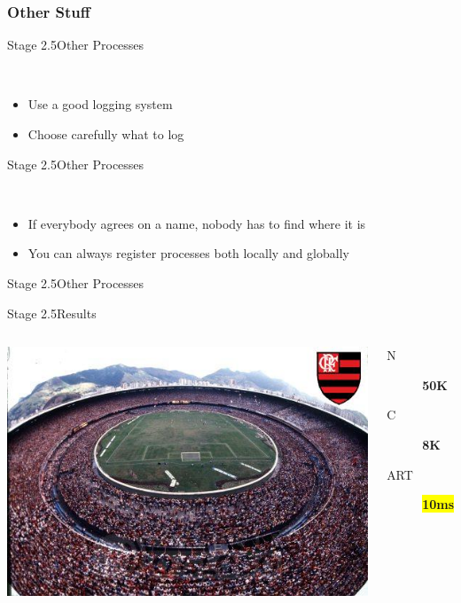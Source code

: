 \documentclass[utf8,hyperref={colorlinks=true}]{beamer}
\begin{document}
\subsubsection{Other Stuff}
\begin{frame}{Stage 2.5}{Other Processes}
	\begin{description}
		\item<+->[Logging]\ \\
			\begin{itemize}
				\item Use a good logging system
				\item Choose carefully what to log
			\end{itemize}
	\end{description}
\end{frame}
\begin{frame}{Stage 2.5}{Other Processes}
	\begin{description}
		\item<+->[Registration]\ \\
			\begin{itemize}
				\item If everybody agrees on a name, nobody has to find where it is
				\item You can always register processes \alert{both} locally and globally
			\end{itemize}
	\end{description}
\end{frame}
\begin{frame}{Stage 2.5}{Other Processes}
\dispatcher
\end{frame}
\begin{frame}{Stage 2.5}{Results}
	\begin{columns}
			\includegraphics[top=-1,width=\textwidth]{img/results-3-5.jpg}
			\begin{description}
				\item[N] \textbf{\Large 50K}
				\item[C] \textbf{\Large 8K}
				\item[ART] \textbf{\colorbox{yellow}{\Large 10ms}}
			\end{description}
	\end{columns}
\end{frame}
\end{document}
